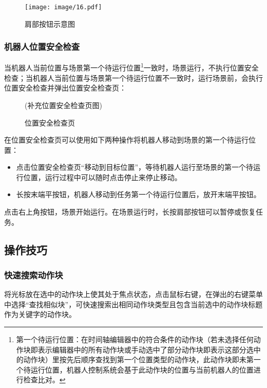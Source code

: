 \begin{figure}[ht]
	\centering
	\texttt{[image: image/16.pdf]}
	\caption{肩部按钮示意图}
	\label{fig:肩部按钮示意图}
\end{figure}


\subsubsection{机器人位置安全检查}
当机器人当前位置与场景第一个待运行位置\footnote{ 第一个待运行位置：在时间轴编辑器中的符合条件的动作块（若未选择任何动作块即表示编辑器中的所有动作块或手动选中了部分动作块即表示这部分选中的动作块）里按先后顺序查找到第一个位置类型的动作块，此动作块即未第一个待运行位置，机器人控制系统会基于此动作块的位置与当前机器人的位置进行检查比对。}一致时，场景运行，不执行位置安全检查；当机器人当前位置与场景第一个待运行位置不一致时，运行场景前，会执行位置安全检查并弹出位置安全检查页：

\begin{figure}[ht]
	\centering
	\color{red}(补充位置安全检查页图)
	\caption{位置安全检查页}
	\label{fig:位置安全检查页}
\end{figure}

在位置安全检查页可以使用如下两种操作将机器人移动到场景的第一个待运行位置：
\begin{itemize}
	\item 点击位置安全检查页“移动到目标位置”，等待机器人运行至场景的第一个待运行位置，运行过程中可以随时点击停止来停止移动。
	\item 长按末端平按钮，机器人移动到任务第一个待运行位置后，放开末端平按钮。
\end{itemize}


点击右上角按钮，场景开始运行。在场景运行时，长按肩部按钮可以暂停或恢复任务。

\subsection{操作技巧}
\subsubsection{快速搜索动作块}
将光标放在选中的动作块上使其处于焦点状态，点击鼠标右键，在弹出的右键菜单中选择“查找相似块”，可快速搜索出相同动作块类型且包含当前选中的动作块标题作为关键字的动作块。
